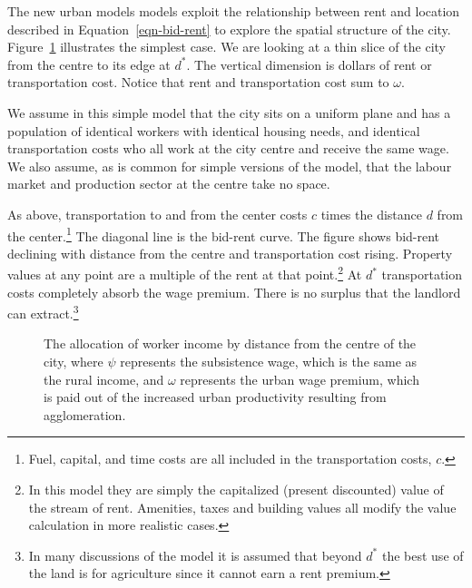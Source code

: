 The new urban models models exploit the relationship between rent and location  described in  Equation~\ref{eqn-bid-rent} to explore the spatial structure of the city. Figure~\ref{fig-alonso-simple} illustrates the simplest case. We are looking at a thin slice of the city from the centre to its edge at $d^*$. The vertical dimension is dollars of rent or transportation cost.  Notice that rent and transportation cost sum to $\omega$. 

We assume in this simple model that the city sits on a uniform plane and has a population of identical workers with identical housing needs, and identical transportation costs who all work at the city centre and receive the same wage. We also assume, as is common for simple versions of the model, that the labour market and production sector at the centre take no space. 

As above, transportation to and from the center costs ${c}$ times the distance $d$ from the center.\footnote{Fuel, capital, and time costs are  all included in the transportation costs, ${c}$. } The diagonal line is the bid-rent curve. The figure shows  bid-rent declining with distance from the centre and transportation cost rising. Property values at any point are a multiple of the rent at that point.\footnote{In this model they are simply the capitalized (present discounted) value of the stream of rent. Amenities, taxes and building values all modify the value calculation in more realistic cases.} At $d^*$ transportation costs completely absorb the wage premium. There is no surplus that the landlord can extract.\footnote{In many discussions of the model it is assumed that beyond $d^*$ the best use of the land is for agriculture since it cannot earn a rent premium. }

\begin{figure}[!ht]
    \begin{center}
    
    \caption[The allocation of worker income by distance from the centre of the city.]{The allocation of worker income by distance from the centre of the city, where $\psi$ represents the \gls{subsistence wage}, which is the same as the rural income, and $\omega$ represents the \gls{urban wage premium}, which is paid out of the increased urban productivity resulting from agglomeration.}
    \label{fig-alonso-simple}
    \end{center}
\end{figure}

 

